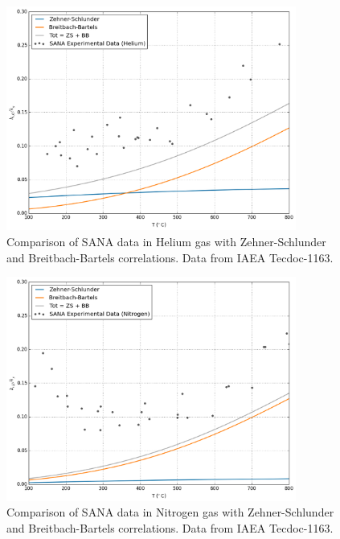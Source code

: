 \begin{figure}[ht]
    \centering
    \includegraphics[width=0.85\textwidth]{figures/keff-sana-he}
    \caption{Comparison of SANA data in Helium gas with Zehner-Schlunder and Breitbach-Bartels correlations. Data from IAEA Tecdoc-1163\cite{Report2000}.}
    \label{fig:keff-sana-he}
\end{figure}
\begin{figure}[ht]
    \centering
    \includegraphics[width=0.85\textwidth]{figures/keff-sana-n}
    \caption{Comparison of SANA data in Nitrogen gas with Zehner-Schlunder and Breitbach-Bartels correlations. Data from IAEA Tecdoc-1163\cite{Report2000}.}
    \label{fig:keff-sana-n}
\end{figure}

\FloatBarrier



%
%
